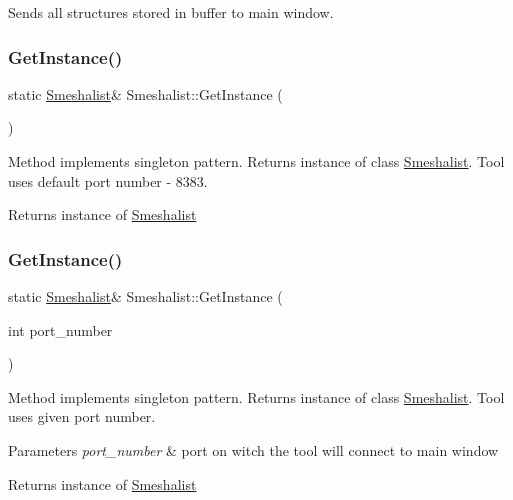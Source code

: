 Sends all structures stored in buffer to main window. \hypertarget{class_smeshalist_ae8da75b21c37c5559aa39318e039694a}{}\label{class_smeshalist_ae8da75b21c37c5559aa39318e039694a} 
\subsubsection{\texorpdfstring{Get\+Instance()}{GetInstance()}\hspace{0.1cm}{\footnotesize\ttfamily [1/2]}}
{\footnotesize\ttfamily static \hyperlink{class_smeshalist}{Smeshalist}\& Smeshalist\+::\+Get\+Instance (\begin{DoxyParamCaption}{ }\end{DoxyParamCaption})\hspace{0.3cm}{\ttfamily [static]}}

Method implements singleton pattern. Returns instance of class \hyperlink{class_smeshalist}{Smeshalist}. Tool uses default port number -\/ 8383. \begin{DoxyReturn}{Returns}
instance of \hyperlink{class_smeshalist}{Smeshalist} 
\end{DoxyReturn}
\hypertarget{class_smeshalist_a44524c05ed6ebe5ad1a632378d5d4037}{}\label{class_smeshalist_a44524c05ed6ebe5ad1a632378d5d4037} 
\subsubsection{\texorpdfstring{Get\+Instance()}{GetInstance()}\hspace{0.1cm}{\footnotesize\ttfamily [2/2]}}
{\footnotesize\ttfamily static \hyperlink{class_smeshalist}{Smeshalist}\& Smeshalist\+::\+Get\+Instance (\begin{DoxyParamCaption}\item[{int}]{port\+\_\+number }\end{DoxyParamCaption})\hspace{0.3cm}{\ttfamily [static]}}

Method implements singleton pattern. Returns instance of class \hyperlink{class_smeshalist}{Smeshalist}. Tool uses given port number. 
\begin{DoxyParams}{Parameters}
{\em port\+\_\+number} & port on witch the tool will connect to main window \\
\hline
\end{DoxyParams}
\begin{DoxyReturn}{Returns}
instance of \hyperlink{class_smeshalist}{Smeshalist} 
\end{DoxyReturn}
\hypertarget{class_smeshalist_aeb4349559d8417e17fb659827dec57c7}{}\label{class_smeshalist_aeb4349559d8417e17fb659827dec57c7} 
